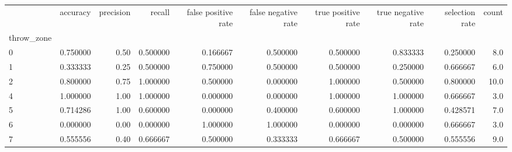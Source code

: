 \begin{tabular}{lrrrrrrrrr}
\toprule
{} &  accuracy &  precision &    recall &  false positive rate &  false negative rate &  true positive rate &  true negative rate &  selection rate &  count \\
throw\_zone &           &            &           &                      &                      &                     &                     &                 &        \\
\midrule
0          &  0.750000 &       0.50 &  0.500000 &             0.166667 &             0.500000 &            0.500000 &            0.833333 &        0.250000 &    8.0 \\
1          &  0.333333 &       0.25 &  0.500000 &             0.750000 &             0.500000 &            0.500000 &            0.250000 &        0.666667 &    6.0 \\
2          &  0.800000 &       0.75 &  1.000000 &             0.500000 &             0.000000 &            1.000000 &            0.500000 &        0.800000 &   10.0 \\
4          &  1.000000 &       1.00 &  1.000000 &             0.000000 &             0.000000 &            1.000000 &            1.000000 &        0.666667 &    3.0 \\
5          &  0.714286 &       1.00 &  0.600000 &             0.000000 &             0.400000 &            0.600000 &            1.000000 &        0.428571 &    7.0 \\
6          &  0.000000 &       0.00 &  0.000000 &             1.000000 &             1.000000 &            0.000000 &            0.000000 &        0.666667 &    3.0 \\
7          &  0.555556 &       0.40 &  0.666667 &             0.500000 &             0.333333 &            0.666667 &            0.500000 &        0.555556 &    9.0 \\
\bottomrule
\end{tabular}
